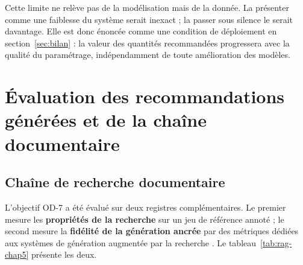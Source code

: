 Cette limite ne relève pas de la modélisation mais de la donnée. La présenter comme une faiblesse du système serait inexact ; la passer sous silence le serait davantage. Elle est donc énoncée comme une condition de déploiement en section~\ref{sec:bilan} : la valeur des quantités recommandées progressera avec la qualité du paramétrage, indépendamment de toute amélioration des modèles.

\section{Évaluation des recommandations générées et de la chaîne documentaire}
\label{sec:eval-reco}

\subsection{Chaîne de recherche documentaire}

L'objectif OD-7 a été évalué sur deux registres complémentaires. Le premier mesure les \textbf{propriétés de la recherche} sur un jeu de référence annoté ; le second mesure la \textbf{fidélité de la génération ancrée} par des métriques dédiées aux systèmes de génération augmentée par la recherche \cite{es2024ragas}. Le tableau~\ref{tab:rag-chap5} présente les deux.

\begingroup
\setlength{\tabcolsep}{3pt}
\renewcommand{\arraystretch}{1.15}
\small

